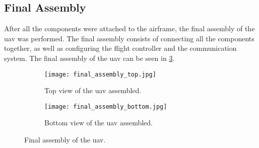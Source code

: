 \subsection{Final Assembly}\label{subsec:implementation_final_assembly}

After all the components were attached to the airframe, the final assembly of the \gls{uav} was performed. The final assembly consists of connecting all the components together, as well as configuring the flight controller and the communication system. The final assembly of the \gls{uav} can be seen in \cref{fig:uav_assembled}.

\begin{figure}
  \hfill
  \begin{subfigure}[t]{0.4\linewidth}
    \texttt{[image: final\_assembly\_top.jpg]}
    \caption{Top view of the \gls{uav} assembled.}\label{fig:uav_assembled_top}
  \end{subfigure}
  \hfill
  \begin{subfigure}[t]{0.4\linewidth}
    \texttt{[image: final\_assembly\_bottom.jpg]}
    \caption{Bottom view of the \gls{uav} assembled.}\label{fig:uav_assembled_bottom}
  \end{subfigure}
  \hfill

  \caption{Final assembly of the \gls{uav}.}\label{fig:uav_assembled}
\end{figure}

